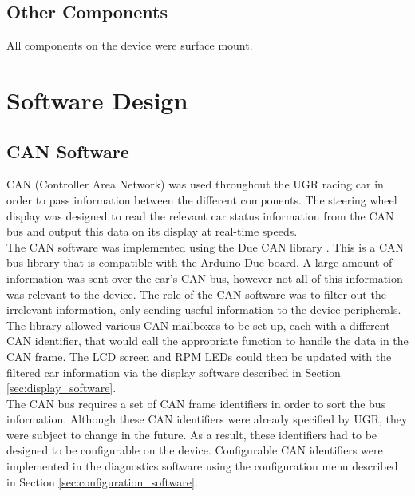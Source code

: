 \documentclass[a4paper,12pt]{article}
\begin{document}
\subsection{Other Components}
\label{sec:other_components}

All components on the device were surface mount.


\newpage
\section{Software Design}
\label{sec:software_design}

\subsection{CAN Software}
\label{sec:CAN_software}

CAN (Controller Area Network) was used throughout the UGR racing car in order to pass information between the different components. The steering wheel display was designed to read the relevant car status information from the CAN bus and output this data on its display at real-time speeds. \\

The CAN software was implemented using the Due CAN library \cite{due_can}. This is a CAN bus library that is compatible with the Arduino Due board. A large amount of information was sent over the car’s CAN bus, however not all of this information was relevant to the device. The role of the CAN software was to filter out the irrelevant information, only sending useful information to the device peripherals. The library allowed various CAN mailboxes to be set up, each with a different CAN identifier, that would call the appropriate function to handle the data in the CAN frame. The LCD screen and RPM LEDs could then be updated with the filtered car information via the display software described in Section \ref{sec:display_software}. \\

The CAN bus requires a set of CAN frame identifiers in order to sort the bus information. Although these CAN identifiers were already specified by UGR, they were subject to change in the future. As a result, these identifiers had to be designed to be configurable on the device. Configurable CAN identifiers were implemented in the diagnostics software using the configuration menu described in Section \ref{sec:configuration_software}.
\end{document}
